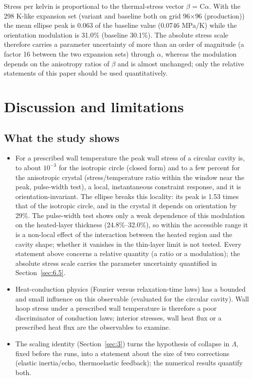\documentclass[preprint,12pt]{elsarticle}
\begin{document}
Stress per kelvin is proportional to the thermal-stress vector $\beta$ = C$\alpha$. With the 298 K-like expansion set (variant and baseline both on grid 96$\times$96 (production)) the mean ellipse peak is 0.063 of the baseline value (0.0746 MPa/K) while the orientation modulation is 31.0\% (baseline 30.1\%). The absolute stress scale therefore carries a parameter uncertainty of more than an order of magnitude (a factor 16 between the two expansion sets) through $\alpha$, whereas the modulation depends on the anisotropy ratios of $\beta$ and is almost unchanged; only the relative statements of this paper should be used quantitatively.

\section{Discussion and limitations}
\label{sec:7}

\subsection{What the study shows}
\label{sec:7.1}

\begin{itemize}
\item For a prescribed wall temperature the peak wall stress of a circular cavity is, to about $10^{-3}$ for the isotropic circle (closed form) and to a few percent for the anisotropic crystal (stress/temperature ratio within the window near the peak, pulse-width test), a local, instantaneous constraint response, and it is orientation-invariant. The ellipse breaks this locality: its peak is 1.53 times that of the isotropic circle, and in the crystal it depends on orientation by 29\%. The pulse-width test shows only a weak dependence of this modulation on the heated-layer thickness (24.8\%--32.0\%), so within the accessible range it is a non-local effect of the interaction between the heated region and the cavity shape; whether it vanishes in the thin-layer limit is not tested. Every statement above concerns a relative quantity (a ratio or a modulation); the absolute stress scale carries the parameter uncertainty quantified in Section~\ref{sec:6.5}.
\item Heat-conduction physics (Fourier versus relaxation-time laws) has a bounded and small influence on this observable (evaluated for the circular cavity). Wall hoop stress under a prescribed wall temperature is therefore a poor discriminator of conduction laws; interior stresses, wall heat flux or a prescribed heat flux are the observables to examine.
\item The scaling identity (Section~\ref{sec:3}) turns the hypothesis of collapse in $\Lambda$, fixed before the runs, into a statement about the size of two corrections (elastic inertia/echo, thermoelastic feedback); the numerical results quantify both.
\end{itemize}
\end{document}
